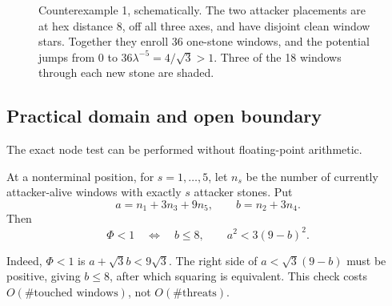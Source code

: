 \begin{figure}[tbp]
  \centering
  \caption{Counterexample 1, schematically.  The two attacker placements are
  at hex distance $8$, off all three axes, and have disjoint clean window
  stars.  Together they enroll 36
  one-stone windows, and the potential jumps from $0$ to
  $36\lambda^{-5}=4/\sqrt3>1$.  Three of the 18 windows through each new
  stone are shaded.}
  \label{fig:es-birth}
\end{figure}

\subsection{Practical domain and open boundary}

The exact node test can be performed without floating-point arithmetic.

\begin{corollary}
\label{cor:ES-C2}
At a nonterminal position, for $s=1,\ldots,5$, let $n_s$ be the number of
currently attacker-alive windows with exactly $s$ attacker stones.  Put
\[
  a=n_1+3n_3+9n_5,
  \qquad b=n_2+3n_4.
\]
Then
\[
  \Phi<1
  \quad\Longleftrightarrow\quad
  b\le8,\qquad a^2<3(9-b)^2.
\]
\end{corollary}

Indeed, $\Phi<1$ is $a+\sqrt3b<9\sqrt3$.  The right side of
$a<\sqrt3(9-b)$ must be positive, giving $b\le8$, after which squaring is
equivalent.  This check costs $O(\#\text{touched windows})$, not
$O(\#\text{threats})$.

